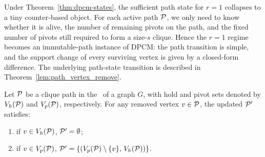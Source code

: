 \label{sec:r1}

Under Theorem~\ref{thm:dpcm-states}, the sufficient path state for $r{=}1$ collapses to a tiny counter-based object.
%
For each active path $\TPath$, we only need to know whether it is alive, the number of remaining pivots on the path, and the fixed number of pivots still required to form a size-$s$ clique.
%
Hence the $r{=}1$ regime becomes an immutable-path instance of DPCM: the path transition is simple, and the support change of every surviving vertex is given by a closed-form difference.
%
The underlying path-state transition is described in Theorem~\ref{lem:path_vertex_remove}.

\begin{theorem}\label{lem:path_vertex_remove}
Let $\TPath$ be a clique path in the \cpi\ of a graph $G$, with hold and pivot
sets denoted by $V_h(\TPath)$ and $V_p(\TPath)$, respectively.
For any removed vertex $v \in \TPath$, the updated $\TPath'$ satisfies:

\begin{enumerate}[leftmargin=*]
    \item if $v \in V_h(\TPath)$, $\TPath' = \emptyset$;
    \item if $v \in V_p(\TPath)$, $\TPath' = \{(V_p(\TPath) \setminus \{v\},\, V_h(\TPath))\}$.
\end{enumerate}


\end{theorem}


